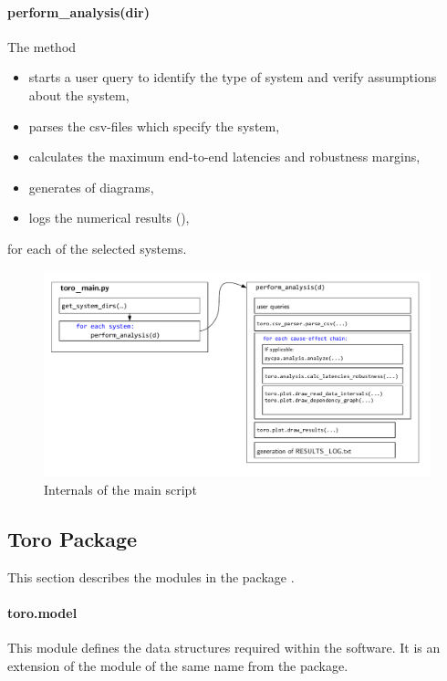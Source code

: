 \paragraph{perform\_analysis(dir)}
The method  
\begin{itemize}[itemsep=0pt]
	\item starts a user query to identify the type of system and verify assumptions about the system,
	\item parses the csv-files which specify the system,
	\item calculates the maximum end-to-end latencies and robustness margins,
	\item generates of diagrams,
	\item logs the numerical results (), 
\end{itemize}
for each of the selected systems.
\begin{figure}[H]
		\centering
		\includegraphics[width=\textwidth]{fig/toro_architecture.pdf}
		\caption{Internals of the main script }
		\label{fig:toro_internals}
\end{figure}

 
\subsection{Toro Package}
\label{sec:toro_lib}
    
This section describes the modules in the package .

\paragraph{toro.model}
This module defines the data structures required within the software. 
It is an extension of the module of the same name from the  package.

